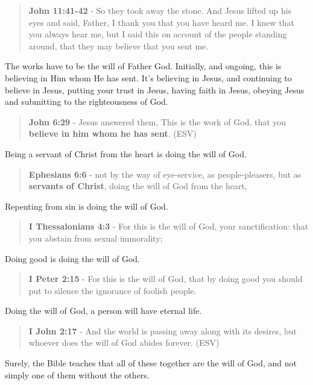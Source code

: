 \documentclass[11pt]{article}
\begin{document}
\begin{quote}
\textbf{John 11:41-42} - So they took away the stone. And Jesus lifted up his eyes and said, Father, I thank you that you have heard me. I knew that you always hear me, but I said this on account of the people standing around, that they may believe that you sent me.
\end{quote}

The works have to be the will of Father God. Initially, and ongoing, this is believing in Him whom He has sent. It's believing in Jesus, and continuing to believe in Jesus, putting your trust in Jesus, having faith in Jesus, obeying Jesus and submitting to the righteousness of God.

\begin{quote}
\textbf{John 6:29} - Jesus answered them, This is the work of God, that you \textbf{believe in him whom he has sent}. (ESV)
\end{quote}

Being a servant of Christ from the heart is doing the will of God.

\begin{quote}
\textbf{Ephesians 6:6} - not by the way of eye-service, as people-pleasers, but as \textbf{servants of Christ}, doing the will of God from the heart,
\end{quote}

Repenting from sin is doing the will of God.

\begin{quote}
\textbf{I Thessalonians 4:3} - For this is the will of God, your sanctification: that you abstain from sexual immorality;
\end{quote}

Doing good is doing the will of God.

\begin{quote}
\textbf{I Peter 2:15} - For this is the will of God, that by doing good you should put to silence the ignorance of foolish people.
\end{quote}

Doing the will of God, a person will have eternal life.

\begin{quote}
\textbf{I John 2:17} - And the world is passing away along with its desires, but whoever does the will of God abides forever. (ESV)
\end{quote}

Surely, the Bible teaches that all of these together are the will of God, and not simply one of them without the others.
\end{document}

